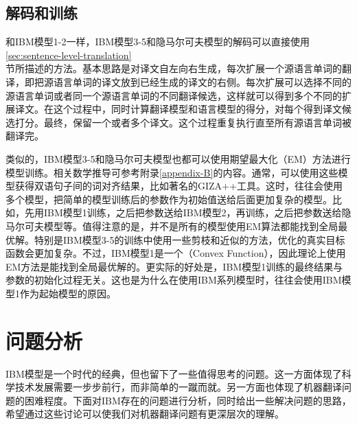 \subsection{解码和训练}

\parinterval 和IBM模型1-2一样，IBM模型3-5和隐马尔可夫模型的解码可以直接使用\ref{sec:sentence-level-translation}\\节所描述的方法。基本思路是对译文自左向右生成，每次扩展一个源语言单词的翻译，即把源语言单词的译文放到已经生成的译文的右侧。每次扩展可以选择不同的源语言单词或者同一个源语言单词的不同翻译候选，这样就可以得到多个不同的扩展译文。在这个过程中，同时计算翻译模型和语言模型的得分，对每个得到译文候选打分。最终，保留一个或者多个译文。这个过程重复执行直至所有源语言单词被翻译完。

\parinterval 类似的，IBM模型3-5和隐马尔可夫模型也都可以使用期望最大化（EM）方法进行模型训练。相关数学推导可参考附录\ref{appendix-B}的内容。通常，可以使用这些模型获得双语句子间的词对齐结果，比如著名的GIZA++工具。这时，往往会使用多个模型，把简单的模型训练后的参数作为初始值送给后面更加复杂的模型。比如，先用IBM模型1训练，之后把参数送给IBM模型2，再训练，之后把参数送给隐马尔可夫模型等。值得注意的是，并不是所有的模型使用EM算法都能找到全局最优解。特别是IBM模型3-5的训练中使用一些剪枝和近似的方法，优化的真实目标函数会更加复杂。不过，IBM模型1是一个{\small{}}（Convex Function），因此理论上使用EM方法是能找到全局最优解的。更实际的好处是，IBM模型1训练的最终结果与参数的初始化过程无关。这也是为什么在使用IBM系列模型时，往往会使用IBM模型1作为起始模型的原因。


\sectionnewpage
\section{问题分析}

\parinterval IBM模型是一个时代的经典，但也留下了一些值得思考的问题。这一方面体现了科学技术发展需要一步步前行，而非简单的一蹴而就。另一方面也体现了机器翻译问题的困难程度。下面对IBM存在的问题进行分析，同时给出一些解决问题的思路，希望通过这些讨论可以使我们对机器翻译问题有更深层次的理解。


